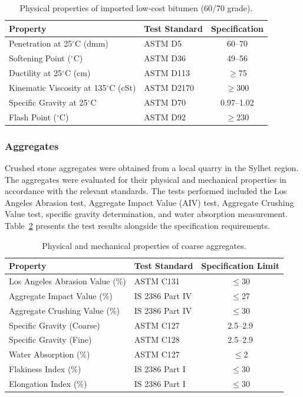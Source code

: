 \documentclass[12pt,a4paper]{article}
\begin{document}
\begin{table}[htbp]
    \centering
    \caption{Physical properties of imported low-cost bitumen (60/70 grade).}
    \label{tab:imported_bitumen}
    \begin{tabular}{@{}llc@{}}
        \toprule
        \textbf{Property} & \textbf{Test Standard} & \textbf{Specification} \\
        \midrule
        Penetration at 25$^{\circ}$C (dmm) & ASTM D5 & 60--70 \\
        Softening Point ($^{\circ}$C) & ASTM D36 & 49--56 \\
        Ductility at 25$^{\circ}$C (cm) & ASTM D113 & $\geq$75 \\
        Kinematic Viscosity at 135$^{\circ}$C (cSt) & ASTM D2170 & $\geq$300 \\
        Specific Gravity at 25$^{\circ}$C & ASTM D70 & 0.97--1.02 \\
        Flash Point ($^{\circ}$C) & ASTM D92 & $\geq$230 \\
        \bottomrule
    \end{tabular}
\end{table}

\subsubsection{Aggregates}

Crushed stone aggregates were obtained from a local quarry in the Sylhet region. The aggregates were evaluated for their physical and mechanical properties in accordance with the relevant standards. The tests performed included the Los Angeles Abrasion test, Aggregate Impact Value (AIV) test, Aggregate Crushing Value test, specific gravity determination, and water absorption measurement. Table~\ref{tab:agg_properties} presents the test results alongside the specification requirements.

\begin{table}[htbp]
    \centering
    \caption{Physical and mechanical properties of coarse aggregates.}
    \label{tab:agg_properties}
    \begin{tabular}{@{}llc@{}}
        \toprule
        \textbf{Property} & \textbf{Test Standard} & \textbf{Specification Limit} \\
        \midrule
        Los Angeles Abrasion Value (\%) & ASTM C131 & $\leq$30 \\
        Aggregate Impact Value (\%) & IS 2386 Part IV & $\leq$27 \\
        Aggregate Crushing Value (\%) & IS 2386 Part IV & $\leq$30 \\
        Specific Gravity (Coarse) & ASTM C127 & 2.5--2.9 \\
        Specific Gravity (Fine) & ASTM C128 & 2.5--2.9 \\
        Water Absorption (\%) & ASTM C127 & $\leq$2 \\
        Flakiness Index (\%) & IS 2386 Part I & $\leq$30 \\
        Elongation Index (\%) & IS 2386 Part I & $\leq$30 \\
        \bottomrule
    \end{tabular}
\end{table}
\end{document}
